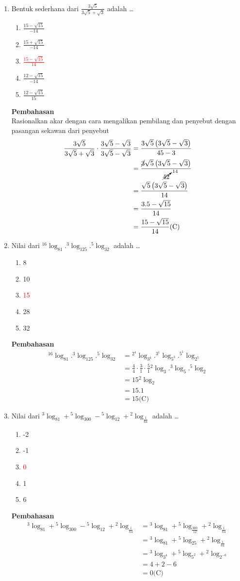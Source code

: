 \documentclass{report}
\newcommand{\options}[5]{
\begin{enumerate}[label=\alph*.]
	\item #1
	\item #2
	\item #3
	\item #4
	\item #5
\end{enumerate}
}
\newcommand{\pemb}{ \textbf{Pembahasan} \\}
\begin{document}
\begin{enumerate}
\item
Bentuk sederhana dari $\frac{3\sqrt{5}}{3\sqrt{5}+\sqrt{3}}$ adalah \ldots
\options
{$\frac{15-\sqrt{15}}{-14}$}
{$\frac{15+\sqrt{15}}{-14}$}
{\textcolor{red}{$\frac{15-\sqrt{15}}{14}$}}
{$\frac{12-\sqrt{15}}{-14}$}
{$\frac{12-\sqrt{15}}{15}$}
\pemb
Rasionalkan akar dengan cara mengalikan pembilang dan penyebut dengan pasangan sekawan dari penyebut
\begin{align*}
	\frac{3\sqrt{5}}{3\sqrt{5}+\sqrt{3}} \cdot \frac{3\sqrt{5}-\sqrt{3}}{3\sqrt{5}-\sqrt{3}}
	&= \frac{3\sqrt{5}\left(3\sqrt{5}-\sqrt{3}\right)}{45-3} \\
	&= \frac{\cancel{3}\sqrt{5}\left(3\sqrt{5}-\sqrt{3}\right)}{\cancelto{14}{42}} \\
	&= \frac{\sqrt{5}\left(3\sqrt{5}-\sqrt{3}\right)}{14} \\
	&= \frac{3.5-\sqrt{15}}{14} \\
	&= \frac{15-\sqrt{15}}{14} \text{(C)}
\end{align*}

\item
Nilai dari ${}^{16}\log_{81}.{}^{3}\log_{125}.{}^{5}\log_{32}$ adalah \ldots
\options
{8}
{10}
{\textcolor{red}{15}}
{28}
{32}
\pemb
\begin{align*}
	{}^{16}\log_{81}.{}^{3}\log_{125}.{}^{5}\log_{32} 
	&= {}^{2^{4}}\log_{3^{4}}.{}^{3^1}\log_{5^3}.{}^{5^1}\log_{2^5} \\
	&= \frac{4}{4}\cdot\frac{3}{1}\cdot\frac{5}{1}{}^{2}\log_{3}.{}^{3}\log_{5}.{}^{5}\log_{2} \\
	&= 15 {}^{2}\log_{2} \\
	&= 15.1 \\
	&= 15 \text{(C)}
\end{align*}

\item
Nilai dari ${}^{3}\log_{81}+{}^{5}\log_{300}-{}^{5}\log_{12}+{}^{2}\log_{\frac{1}{64}}$ adalah \ldots
\options
{-2}
{-1}
{\textcolor{red}0}
{1}
{6}
\pemb
\begin{align*}
	{}^{3}\log_{81}+{}^{5}\log_{300}-{}^{5}\log_{12}+{}^{2}\log_{\frac{1}{64}} 
	&= {}^{3}\log_{81}+{}^{5}\log_{\frac{300}{12}}+{}^{2}\log_{\frac{1}{64}} \\
	&= {}^{3}\log_{81}+{}^{5}\log_{25}+{}^{2}\log_{\frac{1}{64}} \\
	&= {}^{3}\log_{3^4}+{}^{5}\log_{5^2}+{}^{2}\log_{2^{-6}} \\
	&= 4 + 2 - 6 \\
	&= 0 \text{(C)}
\end{align*}


\end{enumerate}
\end{document}
